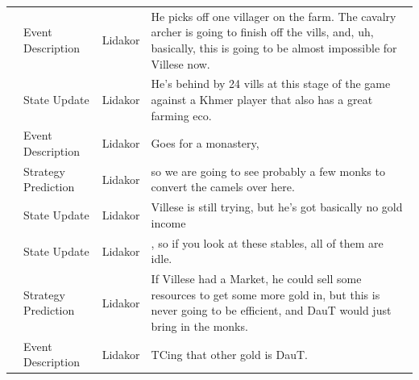 {\begin{longtable}{@{}>{\theAppRow}r|L{2.3cm}L{1.0cm}U{11.55cm}@{}}
    & Event Description     & Lidakor & He picks off one villager on the farm. The cavalry archer is going to finish off the vills, and, uh, basically, this is going to be almost impossible for Villese now.                                                                                                                          \\
    & State Update          & Lidakor & He's behind by 24 vills at this stage of the game against a Khmer player that also has a great farming eco.                                                                                                                                                                                     \\
    & Event Description     & Lidakor & Goes for a monastery,                                                                                                                                                                                                                                                                           \\
    & Strategy Prediction   & Lidakor & so we are going to see probably a few monks to convert the camels over here.                                                                                                                                                                                                                    \\
    & State Update          & Lidakor & Villese is still trying, but he's got basically no gold income                                                                                                                                                                                                                                  \\
    & State Update          & Lidakor & , so if you look at these stables, all of them are idle.                                                                                                                                                                                                                                        \\
    & Strategy Prediction   & Lidakor & If Villese had a Market, he could sell some resources to get some more gold in, but this is never going to be efficient, and DauT would just bring in the monks.                                                                                                                                \\
    & Event Description     & Lidakor & TCing that other gold is DauT.                                                                                                                                                                                                                                                                  \\

\end{longtable}}
